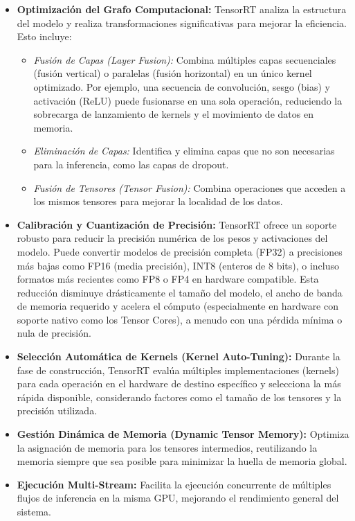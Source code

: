 \documentclass[11pt,spanish,listoffigures,listoftables]{tfgetsinf}
\begin{document}
\begin{itemize}
   \item \textbf{Optimización del Grafo Computacional:} TensorRT analiza la estructura del modelo y realiza transformaciones significativas para mejorar la eficiencia. Esto incluye:
      \begin{itemize}
         \item \textit{Fusión de Capas (Layer Fusion):} Combina múltiples capas secuenciales (fusión vertical) o paralelas (fusión horizontal) en un único kernel optimizado. Por ejemplo, una secuencia de convolución, sesgo (bias) y activación (ReLU) puede fusionarse en una sola operación, reduciendo la sobrecarga de lanzamiento de kernels y el movimiento de datos en memoria.
         \item \textit{Eliminación de Capas:} Identifica y elimina capas que no son necesarias para la inferencia, como las capas de dropout.
         \item \textit{Fusión de Tensores (Tensor Fusion):} Combina operaciones que acceden a los mismos tensores para mejorar la localidad de los datos.
      \end{itemize}
   \item \textbf{Calibración y Cuantización de Precisión:} TensorRT ofrece un soporte robusto para reducir la precisión numérica de los pesos y activaciones del modelo. Puede convertir modelos de precisión completa (FP32) a precisiones más bajas como FP16 (media precisión), INT8 (enteros de 8 bits), o incluso formatos más recientes como FP8 o FP4 en hardware compatible. Esta reducción disminuye drásticamente el tamaño del modelo, el ancho de banda de memoria requerido y acelera el cómputo (especialmente en hardware con soporte nativo como los Tensor Cores), a menudo con una pérdida mínima o nula de precisión.
   \item \textbf{Selección Automática de Kernels (Kernel Auto-Tuning):} Durante la fase de construcción, TensorRT evalúa múltiples implementaciones (kernels) para cada operación en el hardware de destino específico y selecciona la más rápida disponible, considerando factores como el tamaño de los tensores y la precisión utilizada.
   \item \textbf{Gestión Dinámica de Memoria (Dynamic Tensor Memory):} Optimiza la asignación de memoria para los tensores intermedios, reutilizando la memoria siempre que sea posible para minimizar la huella de memoria global.
   \item \textbf{Ejecución Multi-Stream:} Facilita la ejecución concurrente de múltiples flujos de inferencia en la misma GPU, mejorando el rendimiento general del sistema.
\end{itemize}
\end{document}
